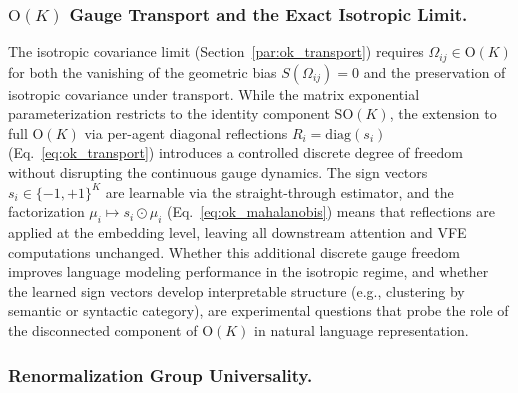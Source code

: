 \documentclass[twoside,11pt]{article}
\begin{document}
\subsubsection{$\mathrm{O}(K)$ Gauge Transport and the Exact Isotropic Limit.}

The isotropic covariance limit (Section~\ref{par:ok_transport}) requires $\Omega_{ij} \in \mathrm{O}(K)$ for both the vanishing of the geometric bias $S(\Omega_{ij}) = 0$ and the preservation of isotropic covariance under transport. While the matrix exponential parameterization restricts to the identity component $\mathrm{SO}(K)$, the extension to full $\mathrm{O}(K)$ via per-agent diagonal reflections $R_i = \mathrm{diag}(s_i)$ (Eq.~\ref{eq:ok_transport}) introduces a controlled discrete degree of freedom without disrupting the continuous gauge dynamics. The sign vectors $s_i \in \{-1,+1\}^K$ are learnable via the straight-through estimator, and the factorization $\mu_i \mapsto s_i \odot \mu_i$ (Eq.~\ref{eq:ok_mahalanobis}) means that reflections are applied at the embedding level, leaving all downstream attention and VFE computations unchanged. Whether this additional discrete gauge freedom improves language modeling performance in the isotropic regime, and whether the learned sign vectors develop interpretable structure (e.g., clustering by semantic or syntactic category), are experimental questions that probe the role of the disconnected component of $\mathrm{O}(K)$ in natural language representation.

\subsubsection{Renormalization Group Universality.}
\end{document}
